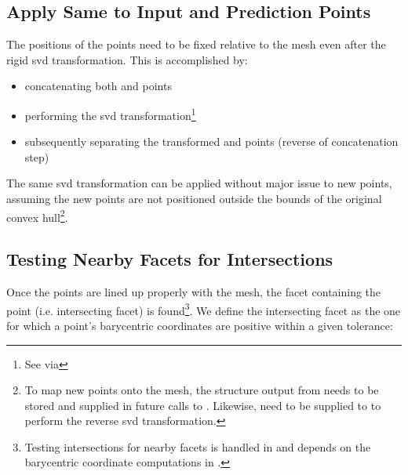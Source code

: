 \documentclass[final,12pt]{elsarticle}
\begin{document}
\subsection{Apply Same  to Input and Prediction Points}
\label{sec:app:bary:int:out-svd}
The positions of the \outpt{} points need to be fixed relative to the mesh even after the rigid \gls{svd} transformation. %
This is accomplished by:
\begin{itemize}%
	\item[2.1a] concatenating both \inpt{} and
	\outpt{} points
	\item[2.1b] performing the \gls{svd} transformation\footnote{See   via }
	\item[2.1c] subsequently separating the transformed \inpt{} and \outpt{} points (reverse of concatenation step)
\end{itemize}
%
The same \gls{svd} transformation can be applied without major issue to new points, assuming the new points are not positioned outside the bounds of the original convex hull\footnote{To map new points onto the mesh, the  structure output from  needs to be stored and supplied in future calls to . Likewise,  need to be supplied to  to perform the reverse \gls{svd} transformation.}.
%
\subsection{Testing Nearby Facets for Intersections}
\label{sec:app:bary:int:facets}
Once the \outpt{} points are lined up properly with the mesh, the facet containing the \outpt{} point (i.e. intersecting facet) is found\footnote{Testing intersections for nearby facets is handled in  and depends on the barycentric coordinate computations in .}. We define the intersecting facet as the one for which a point's barycentric coordinates are positive within a given tolerance:
\end{document}
